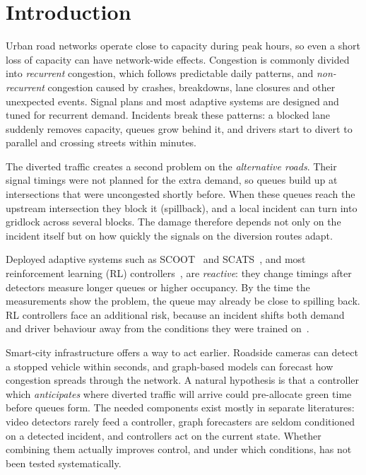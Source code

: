 \documentclass[conference]{IEEEtran}
\begin{document}
\section{Introduction}
Urban road networks operate close to capacity during peak hours, so even a short loss of capacity can have network-wide effects. Congestion is commonly divided into \emph{recurrent} congestion, which follows predictable daily patterns, and \emph{non-recurrent} congestion caused by crashes, breakdowns, lane closures and other unexpected events. Signal plans and most adaptive systems are designed and tuned for recurrent demand. Incidents break these patterns: a blocked lane suddenly removes capacity, queues grow behind it, and drivers start to divert to parallel and crossing streets within minutes.

The diverted traffic creates a second problem on the \emph{alternative roads}. Their signal timings were not planned for the extra demand, so queues build up at intersections that were uncongested shortly before. When these queues reach the upstream intersection they block it (spillback), and a local incident can turn into gridlock across several blocks. The damage therefore depends not only on the incident itself but on how quickly the signals on the diversion routes adapt.

Deployed adaptive systems such as SCOOT~\cite{robertson1991scoot} and SCATS~\cite{sims1980scats}, and most reinforcement learning (RL) controllers~\cite{genders2016deep,wei2018intellilight}, are \emph{reactive}: they change timings after detectors measure longer queues or higher occupancy. By the time the measurements show the problem, the queue may already be close to spilling back. RL controllers face an additional risk, because an incident shifts both demand and driver behaviour away from the conditions they were trained on~\cite{nguyen2025trex}.

Smart-city infrastructure offers a way to act earlier. Roadside cameras can detect a stopped vehicle within seconds, and graph-based models can forecast how congestion spreads through the network. A natural hypothesis is that a controller which \emph{anticipates} where diverted traffic will arrive could pre-allocate green time before queues form. The needed components exist mostly in separate literatures: video detectors rarely feed a controller, graph forecasters are seldom conditioned on a detected incident, and controllers act on the current state. Whether combining them actually improves control, and under which conditions, has not been tested systematically.
\end{document}
